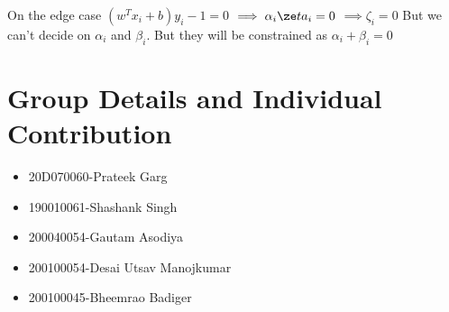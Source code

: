 \documentclass[11pt, twosides]{article}
\begin{document}
On the edge case $(w^Tx_i+b)y_i-1=0$ $\implies \alpha_i\ze  ta_i=0$ $\implies \zeta_i=  0$
But we can't decide on $\alpha_i$ and $\beta_i$. But they will be constrained as $\alpha_i+\beta_i=0$
\section{Group Details and Individual Contribution}
\begin{itemize}
    \item 20D070060-Prateek Garg
    \item 190010061-Shashank Singh
    \item 200040054-Gautam Asodiya
    \item 200100054-Desai Utsav Manojkumar
    \item 200100045-Bheemrao Badiger
\end{itemize}
\end{document}
